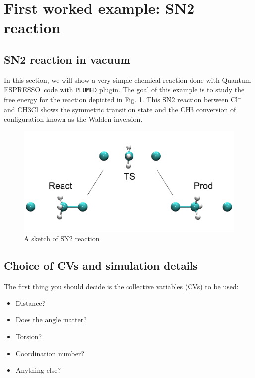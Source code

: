 \documentclass[12pt,a4paper]{article}
\def\qe{{\sc Quantum ESPRESSO}}
\begin{document}
\section{First worked example: SN2 reaction}

\subsection{SN2 reaction in vacuum}

In this section, we will show a very simple chemical reaction done with \qe\ code with \texttt{PLUMED} plugin. The goal of this example is to study the free energy for the reaction depicted in Fig. \ref{Fig_Reaction_sn2}. This SN2 reaction between Cl$^{-}$ and CH3Cl shows the symmetric transition state and the CH3 conversion of configuration known as the Walden inversion\cite{Ensing:2005p53}.

\begin{figure}[htbp]
\begin{center}
\includegraphics[width=\textwidth]{./pic/sn2_reaction.pdf}
\caption{A sketch of SN2 reaction}
\label{Fig_Reaction_sn2}
\end{center}
\end{figure}

\subsection{Choice of CVs and simulation details}

The first thing you should decide is the collective variables (CVs) to be used:

\begin{itemize}
\item Distance?
\item Does the angle matter?
\item Torsion?
\item Coordination number?
\item Anything else?
\end{itemize}
\end{document}
